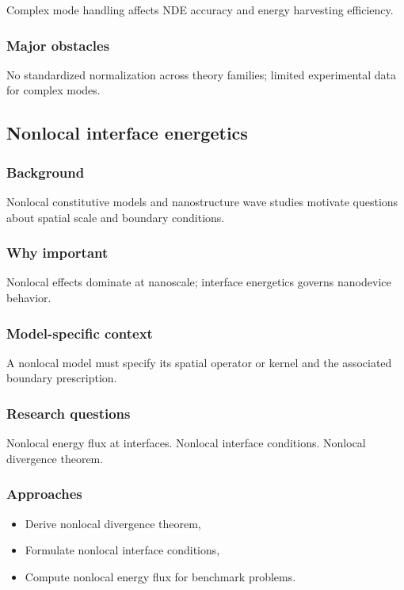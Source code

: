 Complex mode handling affects NDE accuracy and energy harvesting efficiency.

\subsubsection{Major obstacles}

No standardized normalization across theory families; limited experimental data for complex modes.

\subsection{Nonlocal interface energetics}
\label{sec:15.6}

\subsubsection{Background}

Nonlocal constitutive models and nanostructure wave studies motivate questions about spatial scale and boundary conditions.

\subsubsection{Why important}

Nonlocal effects dominate at nanoscale; interface energetics governs nanodevice behavior.

\subsubsection{Model-specific context}

A nonlocal model must specify its spatial operator or kernel and the associated boundary prescription.

\subsubsection{Research questions}

Nonlocal energy flux at interfaces. Nonlocal interface conditions. Nonlocal divergence theorem.

\subsubsection{Approaches}

\begin{itemize}
\item Derive nonlocal divergence theorem,
\item Formulate nonlocal interface conditions,
\item Compute nonlocal energy flux for benchmark problems.
\end{itemize}

